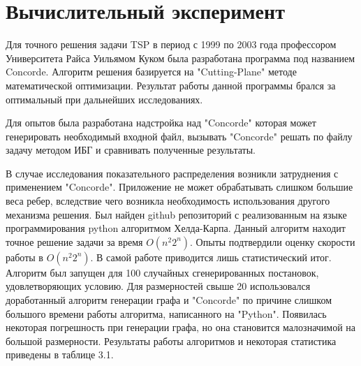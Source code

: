 \documentclass[a4paper, 14pt]{extarticle}
\numberwithin{equation}{section}
\begin{document}
\section{Вычислительный эксперимент}


Для точного решения задачи TSP в период с 1999 по 2003 года профессором Университета Райса Уильямом Куком была разработана программа под названием Concorde. Алгоритм решения базируется на "Cutting-Plane" методе математической оптимизации. Результат работы данной программы брался за оптимальный при дальнейших исследованиях.

Для опытов была разработана надстройка над "Concorde"  которая может генерировать необходимый входной файл, вызывать "Concorde"  решать по файлу задачу методом ИБГ и сравнивать полученные результаты.

В случае исследования показательного распределения возникли затруднения с применением "Concorde". Приложение не может обрабатывать слишком большие веса ребер, вследствие чего возникла необходимость использования другого механизма решения. Был найден github репозиторий с реализованным на языке программирования python алгоритмом Хелда-Карпа. Данный алгоритм находит точное решение задачи за время $O(n^2 2^n)$. Опыты подтвердили оценку скорости работы в $O(n^2 2^n)$. В самой работе приводится лишь статистический итог. Алгоритм был запущен для 100 случайных сгенерированных постановок, удовлетворяющих условию. Для размерностей свыше 20 использовался доработанный алгоритм генерации графа и "Concorde" по причине слишком большого времени работы алгоритма, написанного на "Python". Появилась некоторая погрешность при генерации графа, но она становится малозначимой на большой размерности. Результаты работы алгоритмов и некоторая статистика приведены в таблице 3.1.\\
\end{document}
